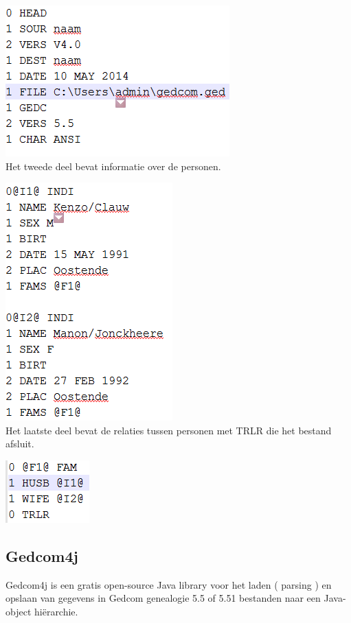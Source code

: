 \documentclass[pdftex,a4paper,12pt,twoside]{report}
\begin{document}
\includegraphics{images/gedcomheader.png}\\

Het tweede deel bevat informatie over de personen.

\includegraphics{images/gedcomperson.png}\\

Het laatste deel bevat de relaties tussen personen met TRLR die het bestand afsluit.

\includegraphics{images/gedcomrelaties.png}\\



\subsection{Gedcom4j}
Gedcom4j is een gratis open-source Java library voor het laden ( parsing ) en opslaan van gegevens in Gedcom genealogie 5.5 of 5.51 bestanden naar een Java-object hiërarchie.
\end{document}
